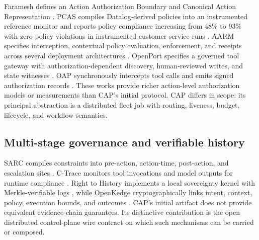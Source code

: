 Faramesh defines an Action Authorization Boundary and Canonical Action Representation \citep{fatmi2026faramesh}. PCAS compiles Datalog-derived policies into an instrumented reference monitor and reports policy compliance increasing from 48\% to 93\% with zero policy violations in instrumented customer-service runs \citep{palumbo2026pcas}. AARM specifies interception, contextual policy evaluation, enforcement, and receipts across several deployment architectures \citep{errico2026aarm}. OpenPort specifies a governed tool gateway with authorization-dependent discovery, human-reviewed writes, and state witnesses \citep{zhu2026openport}. OAP synchronously intercepts tool calls and emits signed authorization records \citep{uchibeke2026oap}. These works provide richer action-level authorization models or measurements than CAP's initial protocol. CAP differs in scope: its principal abstraction is a distributed fleet job with routing, liveness, budget, lifecycle, and workflow semantics.

\subsection{Multi-stage governance and verifiable history}

SARC compiles constraints into pre-action, action-time, post-action, and escalation sites \citep{besanson2026sarc}. C-Trace monitors tool invocations and model outputs for runtime compliance \citep{kahani2026ctrace}. Right to History implements a local sovereignty kernel with Merkle-verifiable logs \citep{zhang2026righthistory}, while OpenKedge cryptographically links intent, context, policy, execution bounds, and outcomes \citep{he2026openkedge}. CAP's initial artifact does not provide equivalent evidence-chain guarantees. Its distinctive contribution is the open distributed control-plane wire contract on which such mechanisms can be carried or composed.

